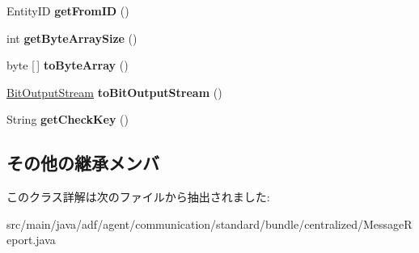 \begin{DoxyCompactItemize}
\item 
\hypertarget{classadf_1_1agent_1_1communication_1_1standard_1_1bundle_1_1centralized_1_1MessageReport_af1b38bb335c11c7294811238a13f8272}{}\label{classadf_1_1agent_1_1communication_1_1standard_1_1bundle_1_1centralized_1_1MessageReport_af1b38bb335c11c7294811238a13f8272} 
Entity\+ID {\bfseries get\+From\+ID} ()
\item 
\hypertarget{classadf_1_1agent_1_1communication_1_1standard_1_1bundle_1_1centralized_1_1MessageReport_aaf6482d2496a30e82525420722c6effe}{}\label{classadf_1_1agent_1_1communication_1_1standard_1_1bundle_1_1centralized_1_1MessageReport_aaf6482d2496a30e82525420722c6effe} 
int {\bfseries get\+Byte\+Array\+Size} ()
\item 
\hypertarget{classadf_1_1agent_1_1communication_1_1standard_1_1bundle_1_1centralized_1_1MessageReport_a903b4d70f9975780b61466b1121dc9a4}{}\label{classadf_1_1agent_1_1communication_1_1standard_1_1bundle_1_1centralized_1_1MessageReport_a903b4d70f9975780b61466b1121dc9a4} 
byte \mbox{[}$\,$\mbox{]} {\bfseries to\+Byte\+Array} ()
\item 
\hypertarget{classadf_1_1agent_1_1communication_1_1standard_1_1bundle_1_1centralized_1_1MessageReport_a012d88c352ce3551a4c6bdc7685f2b92}{}\label{classadf_1_1agent_1_1communication_1_1standard_1_1bundle_1_1centralized_1_1MessageReport_a012d88c352ce3551a4c6bdc7685f2b92} 
\hyperlink{classadf_1_1component_1_1communication_1_1util_1_1BitOutputStream}{Bit\+Output\+Stream} {\bfseries to\+Bit\+Output\+Stream} ()
\item 
\hypertarget{classadf_1_1agent_1_1communication_1_1standard_1_1bundle_1_1centralized_1_1MessageReport_a760930f0020e968ddbd936d897e5e786}{}\label{classadf_1_1agent_1_1communication_1_1standard_1_1bundle_1_1centralized_1_1MessageReport_a760930f0020e968ddbd936d897e5e786} 
String {\bfseries get\+Check\+Key} ()
\end{DoxyCompactItemize}
\subsection*{その他の継承メンバ}


このクラス詳解は次のファイルから抽出されました\+:\begin{DoxyCompactItemize}
\item 
src/main/java/adf/agent/communication/standard/bundle/centralized/Message\+Report.\+java\end{DoxyCompactItemize}
